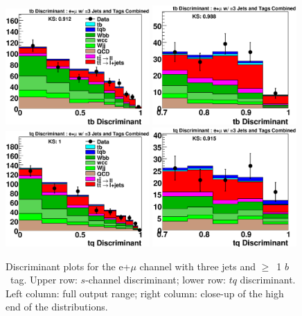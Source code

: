 \vspace{-0.05in}
\begin{figure}[!h!tbp]
\includegraphics[width=0.49\textwidth]
{eps/MatrixElement/output/3jet/All_tb_Discriminant.eps}
\includegraphics[width=0.49\textwidth]
{eps/MatrixElement/output/3jet/All_tb_Discriminant_Zoom.eps}
\includegraphics[width=0.49\textwidth]
{eps/MatrixElement/output/3jet/All_tq_Discriminant.eps}
\includegraphics[width=0.49\textwidth]
{eps/MatrixElement/output/3jet/All_tq_Discriminant_Zoom.eps}
\vspace{-0.1in}
\caption{Discriminant plots for the e+$\mu$ channel with three jets
and $\geq$~1 $b$~tag. Upper row: $s$-channel discriminant; lower row: $tq$
discriminant. Left column: full output range; right column: close-up
of the high end of the distributions.}
\label{e21_3j}
\end{figure}

